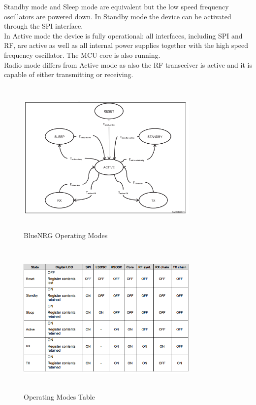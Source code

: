 Standby mode and Sleep mode are equivalent but the low speed frequency oscillators are powered down. In Standby mode the device can be activated through the SPI interface. \\
In Active mode the device is fully operational: all interfaces, including SPI and RF, are active as well as all internal power supplies together with the high speed frequency oscillator. The MCU core is also running. \\
Radio mode differs from Active mode as also the RF transceiver is active and it is capable of either transmitting or receiving.
\begin{figure}[ht]
	\centering
	\includegraphics[width=3.5in, height=3in]{images/operating_modes.png}
	\caption{BlueNRG Operating Modes}
\end{figure}
\begin{figure}[ht]
	\centering
	\includegraphics[width=3.5in, height=3in]{images/operating_modes_table.png}
	\caption{Operating Modes Table}
\end{figure}
